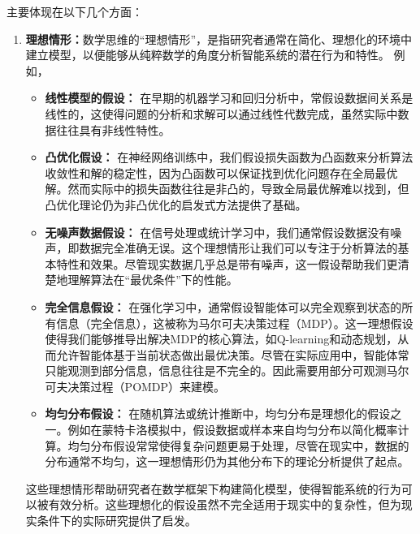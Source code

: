 主要体现在以下几个方面：
\begin{enumerate}
\item {\bf 理想情形：}数学思维的“理想情形”，是指研究者通常在简化、理想化的环境中建立模型，以便能够从纯粹数学的角度分析智能系统的潜在行为和特性。
例如，
\begin{itemize}
\item {\bf 线性模型的假设：} 在早期的机器学习和回归分析中，常假设数据间关系是线性的，这使得问题的分析和求解可以通过线性代数完成，虽然实际中数据往往具有非线性特性。

\item {\bf 凸优化假设：} 在神经网络训练中，我们假设损失函数为凸函数来分析算法收敛性和解的稳定性，因为凸函数可以保证找到优化问题存在全局最优解。然而实际中的损失函数往往是非凸的，导致全局最优解难以找到，但凸优化理论仍为非凸优化的启发式方法提供了基础。

\item{\bf 无噪声数据假设：} 在信号处理或统计学习中，我们通常假设数据没有噪声，即数据完全准确无误。这个理想情形让我们可以专注于分析算法的基本特性和效果。尽管现实数据几乎总是带有噪声，这一假设帮助我们更清楚地理解算法在“最优条件”下的性能。

\item{\bf 完全信息假设：} 在强化学习中，通常假设智能体可以完全观察到状态的所有信息（完全信息），这被称为马尔可夫决策过程（MDP）。这一理想假设使得我们能够推导出解决MDP的核心算法，如Q-learning和动态规划，从而允许智能体基于当前状态做出最优决策。尽管在实际应用中，智能体常只能观测到部分信息，信息往往是不完全的。因此需要用部分可观测马尔可夫决策过程（POMDP）来建模。	
	
\item{\bf 均匀分布假设：} 在随机算法或统计推断中，均匀分布是理想化的假设之一。例如在蒙特卡洛模拟中，假设数据或样本来自均匀分布以简化概率计算。均匀分布假设常常使得复杂问题更易于处理，尽管在现实中，数据的分布通常不均匀，这一理想情形仍为其他分布下的理论分析提供了起点。
\end{itemize}

这些理想情形帮助研究者在数学框架下构建简化模型，使得智能系统的行为可以被有效分析。这些理想化的假设虽然不完全适用于现实中的复杂性，但为现实条件下的实际研究提供了启发。


\end{enumerate}
